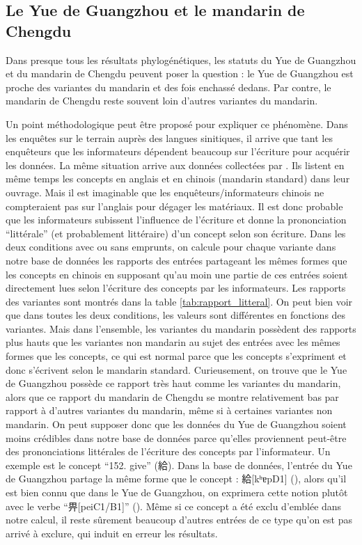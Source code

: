 \documentclass{scrbook}
\newcounter{c}[subsubsection]
\begin{document}
\begin{sloppypar}
\subsection{Le Yue de Guangzhou et le mandarin de Chengdu}
Dans presque tous les résultats phylogénétiques, les statuts du Yue de Guangzhou et du mandarin de Chengdu peuvent poser la question : le Yue de Guangzhou est proche des variantes du mandarin et des fois enchassé dedans. Par contre, le mandarin de Chengdu reste souvent loin d'autres variantes du mandarin. 

Un point méthodologique peut être proposé pour expliquer ce phénomène. Dans les enquêtes sur le terrain auprès des langues sinitiques, il arrive que tant les enquêteurs que les informateurs dépendent beaucoup sur l'écriture pour acquérir les données. La même situation arrive aux données collectées par \textcite{Liu2007hexinci}. Ils listent en même temps les concepts en anglais et en chinois (mandarin standard) dans leur ouvrage. Mais il est imaginable que les enquêteurs/informateurs chinois ne compteraient pas sur l'anglais pour dégager les matériaux. Il est donc probable que les informateurs subissent l'influence de l'écriture et donne la prononciation ``littérale'' (et probablement littéraire) d'un concept selon son écriture. Dans les deux conditions avec ou sans emprunts, on calcule pour chaque variante dans notre base de données les rapports des entrées partageant les mêmes formes que les concepts en chinois en supposant qu'au moin une partie de ces entrées soient directement lues selon l'écriture des concepts par les informateurs. Les rapports des variantes sont montrés dans la table \ref{tab:rapport_litteral}. On peut bien voir que dans toutes les deux conditions, les valeurs sont différentes en fonctions des variantes. Mais dans l'ensemble, les variantes du mandarin possèdent des rapports plus hauts que les variantes non mandarin au sujet des entrées avec les mêmes formes que les concepts, ce qui est normal parce que les concepts s'expriment et donc s'écrivent selon le mandarin standard. Curieusement, on trouve que le Yue de Guangzhou possède ce rapport très haut comme les variantes du mandarin, alors que ce rapport du mandarin de Chengdu se montre relativement bas par rapport à d'autres variantes du mandarin, même si à certaines variantes non mandarin. On peut supposer donc que les données du Yue de Guangzhou soient moins crédibles dans notre base de données parce qu'elles proviennent peut-être des prononciations littérales de l'écriture des concepts par l'informateur. Un exemple est le concept ``152. give'' (給). Dans la base de données, l'entrée du Yue de Guangzhou partage la même forme que le concept : 給[kʰɐpD1] (\cite[51]{Liu2007hexinci}), alors qu'il est bien connu que dans le Yue de Guangzhou, on exprimera cette notion plutôt avec le verbe ``畀[peiC1/B1]'' (\cite[137]{Bai1998Guangzhou}). Même si ce concept a été exclu d'emblée dans notre calcul, il reste sûrement beaucoup d'autres entrées de ce type qu'on est pas arrivé à exclure, qui induit en erreur les résultats.


\end{sloppypar}
\end{document}
